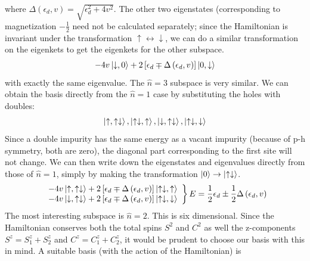 \documentclass[12pt,twoside]{article}
\numberwithin{equation}{section}
\begin{document}
where \(\Delta\left(\epsilon_d , v\right)  = \sqrt{\epsilon_d^2 + 4 v^2}\). The other two eigenstates (corresponding to magnetization \(- \frac{1}{2}\) need not be calculated separately; since the Hamiltonian is invariant under the transformation \( \uparrow \leftrightarrow \downarrow\), we can do a similar transformation on the eigenkets to get the eigenkets for the other subspace.
\begin{equation}\begin{aligned}
	-4v\ket{\downarrow,0} + 2 \left[ \epsilon_d \mp \Delta\left(\epsilon_d , v \right)\right] \ket{0, \downarrow}
\end{aligned}\end{equation}
with exactly the same eigenvalue.
\pb The \(\hat n = 3\) subspace is very similar. We can obtain the basis directly from the \(\hat n = 1\) case by substituting the holes with doubles:
\begin{equation}\begin{aligned}
	\ket{\uparrow,\uparrow \downarrow}, \ket{\uparrow \downarrow,\uparrow}, \ket{\downarrow,\uparrow \downarrow}, \ket{\uparrow \downarrow,\downarrow}
\end{aligned}\end{equation}
Since a double impurity has the same energy as a vacant impurity (because of p-h symmetry, both are zero), the diagonal part corresponding to the first site will not change. We can then write down the eigenstates and eigenvalues directly from those of \(\hat n=1\), simply by making the transformation \(\ket{0} \to \ket{ \uparrow \downarrow}\).
\begin{align}
	\left.
	\begin{array}{l}
	-4v \ket{\uparrow,\uparrow \downarrow} +  2\left[ \epsilon_d \mp \Delta\left(\epsilon_d , v\right)  \right] \ket{\uparrow \downarrow, \uparrow}\\
	-4v \ket{\downarrow,\uparrow \downarrow} + 2 \left[ \epsilon_d \mp \Delta\left(\epsilon_d, v\right)  \right] \ket{\uparrow \downarrow, \downarrow}\end{array}
	\right\}
	E = \frac{1}{2} \epsilon_d \pm \frac{1}{2}\Delta\left(\epsilon_d , v \right)
\end{align}
The most interesting subspace is \(\hat n=2\). This is six dimensional. Since the Hamiltonian conserves both the total spins \(S^2\) and \(C^2\) as well the z-components \(S^z = S_1^z + S^z_2\) and \(C^z = C_1^z + C^z_2\), it would be prudent to choose our basis with this in mind. A suitable basis (with the action of the Hamiltonian) is
\end{document}
